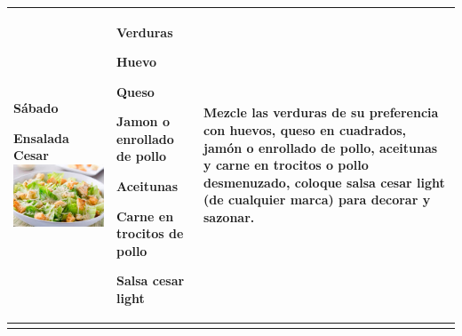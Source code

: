 \documentclass[menu.tex]{subfiles}
\begin{document}
\begin{tabular} {p{3.5cm} p{4cm} p{9cm}}
        \pbox{20cm}
        {
            \rule{0pt}{3ex}\begin{large}\textbf{Sábado}\end{large}\\
            \rule{0pt}{2ex}Ensalada Cesar\\
            \includegraphics[scale=0.40]{ensalada-cesar}
        }& 
        \vspace{-1.6cm}
        \begin{compactitem} 
            \begin{footnotesize}
                \item Verduras
                \item Huevo
                \item Queso
                \item Jamon o enrollado de pollo
                \item Aceitunas
                \item Carne en trocitos de pollo
                \item Salsa cesar light
            \end{footnotesize}
        \end{compactitem}&
        \vspace{-1.6cm}
        Mezcle las verduras de su preferencia con huevos, queso en cuadrados, jamón o enrollado de pollo, aceitunas y carne en trocitos o pollo desmenuzado, coloque salsa cesar light (de cualquier marca) para decorar y sazonar. \\ \hline
\newpage
    \end{tabular}
    
\end{document}
